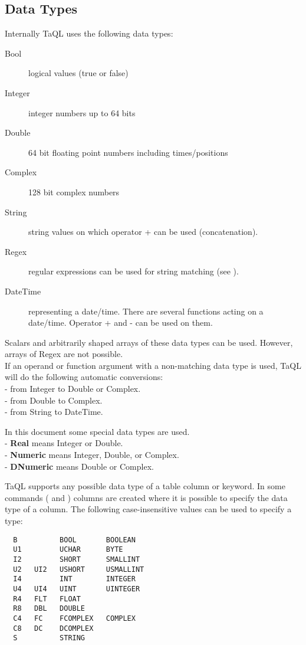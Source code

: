 \subsection{\label{TAQL:DATATYPES}Data Types}
Internally TaQL uses the following data types:
\begin{description}
  \item[Bool ] logical values (true or false)
  \item[Integer ] integer numbers up to 64 bits
  \item[Double ] 64 bit floating point numbers including times/positions
  \item[Complex ] 128 bit complex numbers
  \item[String ] string values on which operator + can be used (concatenation).
  \item[Regex ] regular expressions can be used for string
    matching (see ).
  \item[DateTime ] representing a date/time. There are several functions
       acting on a date/time. Operator + and - can be used on them.
\end{description}
Scalars and arbitrarily shaped arrays of these data types can be used.
However, arrays of Regex are not possible.
\\If an operand or function argument with a non-matching data type
is used, TaQL will do the following automatic conversions:
\\- from Integer to Double or Complex.
\\- from Double to Complex.
\\- from String to DateTime.

In this document some special data types are used.
\\- \textbf{Real} means Integer or Double.
\\- \textbf{Numeric} means Integer, Double, or Complex.
\\- \textbf{DNumeric} means Double or Complex.

\label{TAQL:DATATYPESTRING}
TaQL supports any possible data type of a table column or keyword.
In some commands ( and
) columns are created where
it is possible to specify the data type of a column. 
The following case-insensitive values can be used to specify a type:
\begin{verbatim}
  B          BOOL       BOOLEAN
  U1         UCHAR      BYTE
  I2         SHORT      SMALLINT
  U2   UI2   USHORT     USMALLINT
  I4         INT        INTEGER
  U4   UI4   UINT       UINTEGER
  R4   FLT   FLOAT
  R8   DBL   DOUBLE
  C4   FC    FCOMPLEX   COMPLEX
  C8   DC    DCOMPLEX
  S          STRING
\end{verbatim}

